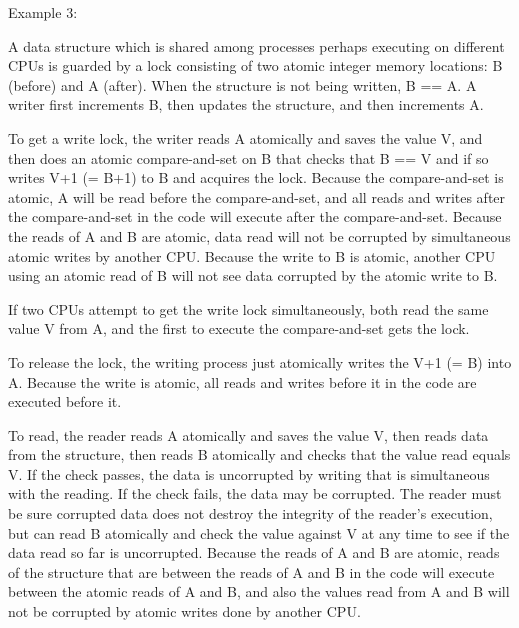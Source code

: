 \documentclass[12pt]{article}
\newenvironment{indpar}[1][0.3in]%
	{\begin{list}{}%
		     {\setlength{\itemsep}{0in}%
		      \setlength{\topsep}{0in}%
		      \setlength{\parsep}{1ex}%
		      \setlength{\labelwidth}{#1}%
		      \setlength{\leftmargin}{#1}%
		      \addtolength{\leftmargin}{\labelsep}}%
	 \item}%
	{\end{list}}
\begin{document}
Example 3:
\begin{indpar}
A data structure which is shared among processes perhaps executing
on different CPUs is guarded by a lock consisting of two atomic integer
memory locations: B (before) and A (after).  When the structure is
not being written, B == A.  A writer first increments B, then
updates the structure, and then increments A.

To get a write lock, the writer reads A atomically and saves the value V,
and then does
an atomic compare-and-set on B that checks that B == V and if so writes
V+1 (= B+1) to B and acquires the lock.  Because the compare-and-set is atomic,
A will be read before the compare-and-set, and all reads and writes
after the compare-and-set in the code will execute after the compare-and-set.
Because the reads of A and B are atomic, data read 
will not be corrupted by simultaneous atomic writes by another CPU.
Because the write to B is atomic, another CPU using an atomic read of B
will not see data corrupted by the atomic write to B.

If two CPUs attempt to get the write lock simultaneously, both read the same
value V from A, and the first to execute the compare-and-set gets the lock.

To release the lock, the writing process just atomically
writes the V+1 (= B) into A.  Because the write is atomic, all reads and
writes before it in the code are executed before it.

To read, the reader reads A atomically and saves the value V,
then reads data from the structure, then reads B atomically and
checks that the value read equals V.  If the check passes, the data
is uncorrupted by writing that is simultaneous with the reading.
If the check fails, the data may be corrupted.  The reader must be
sure corrupted data does not destroy the integrity of the reader's execution,
but can read B atomically and check the value against V
at any time to see if the data read so far is uncorrupted.
Because the reads of A and B are atomic, reads of the structure that
are between the reads of A and B in the code will execute between
the atomic reads of A and B, and also the values read from A and B will not be
corrupted by atomic writes done by another CPU.

\end{indpar}
\end{document}
